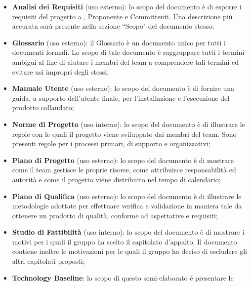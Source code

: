                 \begin{itemize}
                    \item \textbf{Analisi dei Requisiti} (uso esterno): lo scopo del documento è di 
                    esporre i requisiti del progetto a , Proponente e 
                    Committenti.
                    Una descrizione più accurata sarà presente nella sezione ``Scopo" del documento 
                    stesso;
                    \item \textbf{Glossario} (uso esterno): il Glossario è un documento unico per tutti
                    i documenti formali. Lo scopo di tale documento è raggruppare tutti i termini ambigui 
                    al fine di aiutare i membri del team a comprendere tali termini ed evitare usi
                    impropri degli stessi;
                    \item \textbf{Manuale Utente} (uso esterno): lo scopo del documento è di fornire una
                    guida, a supporto dell'utente finale, per l'installazione e l'esecuzione del prodotto
                    collaudato;
                    \item \textbf{Norme di Progetto} (uso interno): lo scopo del documento è di illustrare
                    le regole con le quali il progetto viene sviluppato dai membri del team. Sono presenti
                    regole per i processi primari, di supporto e organizzativi;
                    \item \textbf{Piano di Progetto} (uso esterno): lo scopo del documento è di mostrare
                    come il team gestisce le proprie risorse, come attribuisce
                    responsabilità ed autorità e come il progetto viene distribuito nel tempo di 
                    calendario;
                    \item \textbf{Piano di Qualifica} (uso esterno): lo scopo del documento è di 
                    illustrare le metodologie adottate per effettuare verifica e validazione in maniera 
                    tale da ottenere un prodotto di qualità, conforme ad aspettative e requisiti;
                    \item \textbf{Studio di Fattibilità} (uso interno): lo scopo del documento è di 
                    mostrare i motivi per i quali il gruppo ha scelto il capitolato d'appalto.
                    Il documento contiene inoltre le motivazioni per le quali il gruppo ha deciso
                    di escludere gli altri capitolati proposti;
                    \item \textbf{Technology Baseline}: lo scopo di questo semi-elaborato è presentare le 

\end{itemize}
